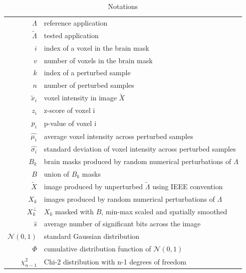 \documentclass[lettersize,journal]{IEEEtran}
\begin{document}
\begin{table}
    \centering
    \begin{tabular}{r|l}
        $\Lambda$          & reference application                                                \\
        $\tilde \Lambda$   & tested application                                                   \\
        $i$                & index of a voxel in the brain mask                                   \\
        $v$                & number of voxels in the brain mask                                   \\
        $k$                & index of a perturbed sample                                          \\
        $n$                & number of perturbed samples                                          \\
        $\tilde x_i$       & voxel intensity in image $\tilde X$                                  \\
        $z_i$              & z-score of voxel i                                                   \\
        $p_i$              & p-value of voxel i                                                   \\
        $\hat{\mu_i}$      & average voxel intensity across perturbed samples                     \\
        $\hat{\sigma_i}$   & standard deviation of voxel intensity across perturbed samples       \\
        $B_k$              & brain masks produced by random numerical perturbations of $\Lambda$  \\
        $B$                & union of $B_k$ masks                                                 \\
        $\tilde X$         & image produced by unperturbed $\tilde \Lambda$ using IEEE convention \\
        $X_k$              & images produced by random numerical perturbations of $\Lambda$       \\
        $X_k^{\perp}$      & $X_k$ masked with $B$, min-max scaled and spatially smoothed         \\
        $\hat{s}$          & average number of significant bits across the image                  \\
        $\mathcal{N}(0,1)$ & standard Gaussian distribution                                       \\
        $\Phi$             & cumulative distribution function of $\mathcal{N}(0,1)$               \\
        $\chi^2_{n-1}$     & Chi-2 distribution with n-1 degrees of freedom                       \\
    \end{tabular}
    \caption{Notations}
    \label{tab:notations}
\end{table}
\end{document}
